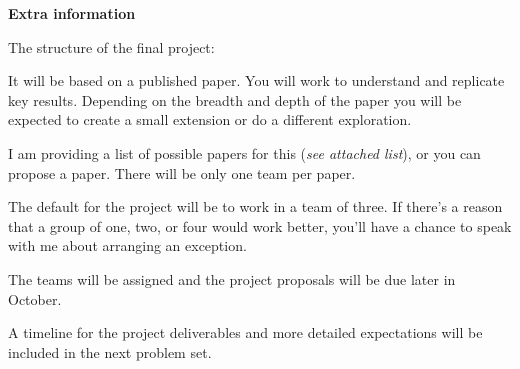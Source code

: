 \documentclass[12pt,letterpaper,noanswers]{exam}
\begin{document}
\noindent\textbf{Extra information}

The structure of the final project:

 It will be based on a published paper.  You will work to understand and replicate key results.  Depending on the breadth and depth of the paper you will be expected to create a small extension or do a different exploration.
 
 I am providing a list of possible papers for this (\emph{see attached list}), or you can propose a paper.  There will be only one team per paper.

The default for the project will be to work in a team of three.  If there's a reason that a group of one, two, or four would work better, you'll have a chance to speak with me about arranging an exception. 

The teams will be assigned and the project proposals will be due later in October. %

A timeline for the project deliverables and more detailed expectations will be included in the next problem set.
\end{document}
